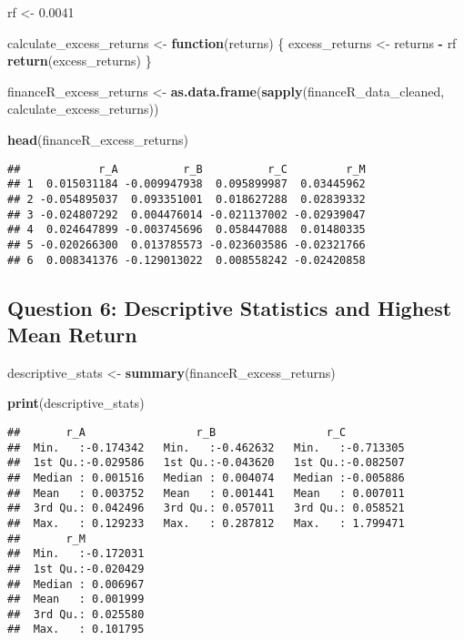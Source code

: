 \documentclass[
]{article}
\newenvironment{Shaded}{\begin{snugshade}}{\end{snugshade}}
\newcommand{\ControlFlowTok}[1]{\textcolor[rgb]{0.13,0.29,0.53}{\textbf{#1}}}
\newcommand{\FloatTok}[1]{\textcolor[rgb]{0.00,0.00,0.81}{#1}}
\newcommand{\FunctionTok}[1]{\textcolor[rgb]{0.13,0.29,0.53}{\textbf{#1}}}
\newcommand{\NormalTok}[1]{#1}
\newcommand{\OtherTok}[1]{\textcolor[rgb]{0.56,0.35,0.01}{#1}}
\newcommand{\SpecialCharTok}[1]{\textcolor[rgb]{0.81,0.36,0.00}{\textbf{#1}}}
\begin{document}
\begin{Shaded}
\begin{Highlighting}[]
\NormalTok{rf }\OtherTok{\textless{}{-}} \FloatTok{0.0041}

\NormalTok{calculate\_excess\_returns }\OtherTok{\textless{}{-}} \ControlFlowTok{function}\NormalTok{(returns) \{}
\NormalTok{  excess\_returns }\OtherTok{\textless{}{-}}\NormalTok{ returns }\SpecialCharTok{{-}}\NormalTok{ rf}
  \FunctionTok{return}\NormalTok{(excess\_returns)}
\NormalTok{\}}

\NormalTok{financeR\_excess\_returns }\OtherTok{\textless{}{-}} \FunctionTok{as.data.frame}\NormalTok{(}\FunctionTok{sapply}\NormalTok{(financeR\_data\_cleaned, calculate\_excess\_returns))}

\FunctionTok{head}\NormalTok{(financeR\_excess\_returns)}
\end{Highlighting}
\end{Shaded}

\begin{verbatim}
##            r_A          r_B          r_C         r_M
## 1  0.015031184 -0.009947938  0.095899987  0.03445962
## 2 -0.054895037  0.093351001  0.018627288  0.02839332
## 3 -0.024807292  0.004476014 -0.021137002 -0.02939047
## 4  0.024647899 -0.003745696  0.058447088  0.01480335
## 5 -0.020266300  0.013785573 -0.023603586 -0.02321766
## 6  0.008341376 -0.129013022  0.008558242 -0.02420858
\end{verbatim}

\hypertarget{question-6-descriptive-statistics-and-highest-mean-return}{%
\subsection{Question 6: Descriptive Statistics and Highest Mean
Return}\label{question-6-descriptive-statistics-and-highest-mean-return}}

\begin{Shaded}
\begin{Highlighting}[]
\NormalTok{descriptive\_stats }\OtherTok{\textless{}{-}} \FunctionTok{summary}\NormalTok{(financeR\_excess\_returns)}

\FunctionTok{print}\NormalTok{(descriptive\_stats)}
\end{Highlighting}
\end{Shaded}

\begin{verbatim}
##       r_A                 r_B                 r_C           
##  Min.   :-0.174342   Min.   :-0.462632   Min.   :-0.713305  
##  1st Qu.:-0.029586   1st Qu.:-0.043620   1st Qu.:-0.082507  
##  Median : 0.001516   Median : 0.004074   Median :-0.005886  
##  Mean   : 0.003752   Mean   : 0.001441   Mean   : 0.007011  
##  3rd Qu.: 0.042496   3rd Qu.: 0.057011   3rd Qu.: 0.058521  
##  Max.   : 0.129233   Max.   : 0.287812   Max.   : 1.799471  
##       r_M           
##  Min.   :-0.172031  
##  1st Qu.:-0.020429  
##  Median : 0.006967  
##  Mean   : 0.001999  
##  3rd Qu.: 0.025580  
##  Max.   : 0.101795
\end{verbatim}
\end{document}

